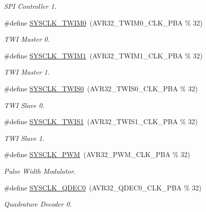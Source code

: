 \begin{DoxyCompactItemize}
\begin{DoxyCompactList}\small\item\em \-S\-P\-I \-Controller 1. \end{DoxyCompactList}\item 
\#define \hyperlink{group__sysclk__group_ga8c2db97d4e5879b8e79271ad4317965c}{\-S\-Y\-S\-C\-L\-K\-\_\-\-T\-W\-I\-M0}~(\-A\-V\-R32\-\_\-\-T\-W\-I\-M0\-\_\-\-C\-L\-K\-\_\-\-P\-B\-A \% 32)
\begin{DoxyCompactList}\small\item\em \-T\-W\-I \-Master 0. \end{DoxyCompactList}\item 
\#define \hyperlink{group__sysclk__group_gaa6b40c9fda3fc4cf86201bf5d35c60e4}{\-S\-Y\-S\-C\-L\-K\-\_\-\-T\-W\-I\-M1}~(\-A\-V\-R32\-\_\-\-T\-W\-I\-M1\-\_\-\-C\-L\-K\-\_\-\-P\-B\-A \% 32)
\begin{DoxyCompactList}\small\item\em \-T\-W\-I \-Master 1. \end{DoxyCompactList}\item 
\#define \hyperlink{group__sysclk__group_gaacb0f0e01d42f813394a6dc51171d0f1}{\-S\-Y\-S\-C\-L\-K\-\_\-\-T\-W\-I\-S0}~(\-A\-V\-R32\-\_\-\-T\-W\-I\-S0\-\_\-\-C\-L\-K\-\_\-\-P\-B\-A \% 32)
\begin{DoxyCompactList}\small\item\em \-T\-W\-I \-Slave 0. \end{DoxyCompactList}\item 
\#define \hyperlink{group__sysclk__group_ga8949d9bb62e29e020979d3d428d8fb53}{\-S\-Y\-S\-C\-L\-K\-\_\-\-T\-W\-I\-S1}~(\-A\-V\-R32\-\_\-\-T\-W\-I\-S1\-\_\-\-C\-L\-K\-\_\-\-P\-B\-A \% 32)
\begin{DoxyCompactList}\small\item\em \-T\-W\-I \-Slave 1. \end{DoxyCompactList}\item 
\#define \hyperlink{group__sysclk__group_gaba7d5c176ee1112b9f590ac775615e36}{\-S\-Y\-S\-C\-L\-K\-\_\-\-P\-W\-M}~(\-A\-V\-R32\-\_\-\-P\-W\-M\-\_\-\-C\-L\-K\-\_\-\-P\-B\-A \% 32)
\begin{DoxyCompactList}\small\item\em \-Pulse \-Width \-Modulator. \end{DoxyCompactList}\item 
\#define \hyperlink{group__sysclk__group_gab8b5a16f6564fc83a5627c61468a635a}{\-S\-Y\-S\-C\-L\-K\-\_\-\-Q\-D\-E\-C0}~(\-A\-V\-R32\-\_\-\-Q\-D\-E\-C0\-\_\-\-C\-L\-K\-\_\-\-P\-B\-A \% 32)
\begin{DoxyCompactList}\small\item\em \-Quadrature \-Decoder 0. \end{DoxyCompactList}\item 

\end{DoxyCompactItemize}
